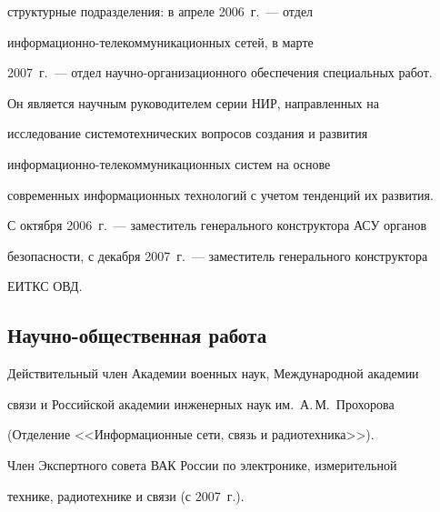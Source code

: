 структурные подразделения: в апреле 2006~г.~--- отдел 


ин\-фор\-ма\-ци\-он\-но-те\-ле\-ком\-му\-ни\-ка\-ци\-он\-ных сетей, в марте 


2007~г.~--- отдел научно-организационного обеспечения специальных работ.





Он является научным руководителем серии НИР, направленных на 


исследование системотехнических вопросов создания и развития 


ин\-фор\-ма\-ци\-он\-но-те\-ле\-ком\-му\-ни\-ка\-ци\-он\-ных сис\-тем на основе 


современных информационных технологий с учетом тенденций их развития.





С октября 2006~г.~--- заместитель генерального конструктора АСУ органов 


безопасности, с декабря 2007~г.~--- за\-мес\-ти\-тель генерального конструктора 


ЕИТКС ОВД.





\vspace*{-6pt}





     \subsection*{Научно-общественная работа}


     


     \vspace*{-3pt}


     


Действительный член Академии военных наук, Международной академии 


связи и Российской академии инженерных наук им.\ А.\,М.~Прохорова 


(Отделение <<Информационные сети, связь и радиотехника>>).





Член Экспертного совета ВАК России по электронике, измерительной 


технике, радиотехнике и связи (с 2007~г.).





